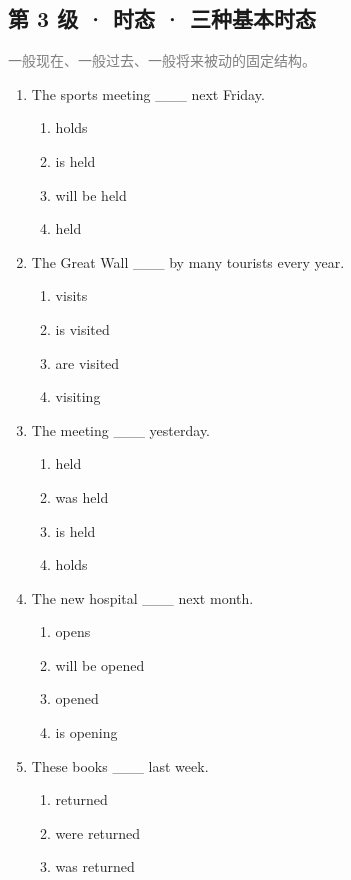 \documentclass[11pt,a4paper]{ctexart}
\begin{document}
\subsection*{第 3 级 · 时态 · 三种基本时态}
\noindent\textcolor{gray}{一般现在、一般过去、一般将来被动的固定结构。}\par\smallskip
\begin{enumerate}[leftmargin=*,itemsep=4pt]
\item The sports meeting \_\_\_ next Friday.
\begin{enumerate}[label=\Alph*.,leftmargin=2em,itemsep=1pt,topsep=2pt]
\item holds
\item is held
\item will be held
\item held
\end{enumerate}
\item The Great Wall \_\_\_ by many tourists every year.
\begin{enumerate}[label=\Alph*.,leftmargin=2em,itemsep=1pt,topsep=2pt]
\item visits
\item is visited
\item are visited
\item visiting
\end{enumerate}
\item The meeting \_\_\_ yesterday.
\begin{enumerate}[label=\Alph*.,leftmargin=2em,itemsep=1pt,topsep=2pt]
\item held
\item was held
\item is held
\item holds
\end{enumerate}
\item The new hospital \_\_\_ next month.
\begin{enumerate}[label=\Alph*.,leftmargin=2em,itemsep=1pt,topsep=2pt]
\item opens
\item will be opened
\item opened
\item is opening
\end{enumerate}
\item These books \_\_\_ last week.
\begin{enumerate}[label=\Alph*.,leftmargin=2em,itemsep=1pt,topsep=2pt]
\item returned
\item were returned
\item was returned

\end{enumerate}
\end{enumerate}
\end{document}
